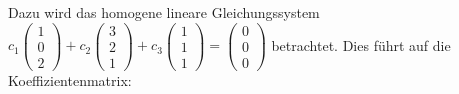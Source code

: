 Dazu wird das homogene lineare Gleichungssystem $c_1 \begin{pmatrix} 1 \\ 0 \\ 2 \end{pmatrix} + c_2 \begin{pmatrix} 3 \\ 2 \\ 1 \end{pmatrix} + c_3 \begin{pmatrix} 1 \\ 1 \\ 1 \end{pmatrix} = \begin{pmatrix} 0 \\ 0 \\ 0 \end{pmatrix}$ betrachtet. Dies führt auf die Koeffizientenmatrix:

